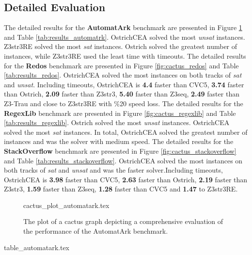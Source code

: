 \documentclass{standalone}
\begin{document}
\subsection{Detailed Evaluation}
The detailed results for the \textbf{AutomatArk} benchmark are presented in Figure \ref{fig:cactus_automatrk} and Table \ref{tab:results_automatrk}. OstrichCEA solved the most \emph{unsat} instances. Z3str3RE solved the most \emph{sat} instances. Ostrich solved the greatest number of instances, while Z3str3RE used the least time with timeouts.\newline
The detailed results for the \textbf{Redos} benchmark are presented in Figure \ref{fig:cactus_redos} and Table \ref{tab:results_redos}. OstrichCEA solved the most instances on both tracks of \emph{sat} and \emph{unsat}. Including timeouts, OstrichCEA is \textbf{4.4}\mult{} faster than CVC5, \textbf{3.74}\mult{} faster than Ostrich, \textbf{2.09}\mult{} faster than Z3str3, \textbf{5.40}\mult{} faster than Z3seq, \textbf{2.49}\mult{} faster than Z3-Trau and close to Z3str3RE with \%20 speed loss. \newline 
The detailed results for the \textbf{RegexLib} benchmark are presented in Figure \ref{fig:cactus_regexlib} and Table \ref{tab:results_regexlib}. Ostrich solved the most \emph{unsat} instances. OstrichCEA solved the most \emph{sat} instances. In total, OstrichCEA solved the greatest number of instances and was the solver with medium speed. \newline
The detailed results for the \textbf{StackOverflow} benchmark are presented in Figure \ref{fig:cactus_stackoverflow} and Table \ref{tab:results_stackoverflow}. OstrichCEA solved the most instances on both tracks of \emph{sat} and \emph{unsat} and was the faster solver.\newline Including timeouts, OstrichCEA is \textbf{3.98}\mult{} faster than CVC5, \textbf{2.63}\mult{} faster than Ostrich, \textbf{2.19}\mult{} faster than Z3str3, \textbf{1.59}\mult{} faster than Z3seq, \textbf{1.28}\mult{} faster than CVC5 and \textbf{1.47}\mult{} to Z3str3RE. \newline
\begin{figure}
  \centering
  {cactus_plot_automatark.tex}
  \caption{The plot of a cactus graph depicting a comprehensive evaluation of the performance of the AutomatArk benchmark.}
  \label{fig:cactus_automatrk}
\end{figure}
\begin{table}
  {table_automatark.tex}
  \caption{Detailed results for the AutomatArk benchmark.}
  \label{tab:results_automatrk}
\end{table}
\end{document}
